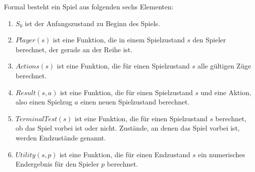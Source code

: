Formal besteht ein Spiel aus folgenden sechs Elementen:
\begin{enumerate}
    \item $S_0$ ist der Anfangszustand zu Beginn des Spiels.
    \item $Player(s)$ ist eine Funktion, die in einem Spielzustand $s$ den Spieler berechnet, der gerade an der Reihe
    ist.
    \item $Actions(s)$ ist eine Funktion, die für einen Spielzustand $s$ alle gültigen Züge berechnet.
    \item $Result(s, a)$ ist eine Funktion, die für einen Spielzustand $s$ und eine Aktion, also einen Spielzug $a$
    einen neuen Spielzustand berechnet.
    \item $TerminalTest(s)$ ist eine Funktion, die für einen Spielzustand $s$ berechnet, ob das Spiel vorbei ist oder
    nicht. Zustände, an denen das Spiel vorbei ist, werden Endzustände genannt.
    \item $Utility(s, p)$ ist eine Funktion, die für einen Endzustand $s$ ein numerisches Endergebnis für den Spieler
    $p$ berechnet.
\end{enumerate}
